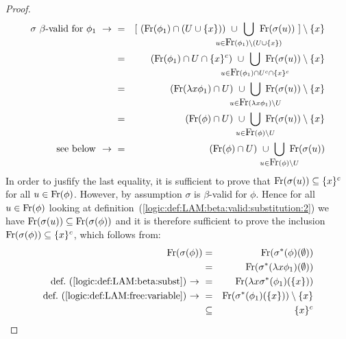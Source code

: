 \begin{proof}
\begin{eqnarray*}
        \mbox{$\sigma$ $\beta$-valid for $\phi_{1}\ \rightarrow\ $}
        &=& [\ (\free(\phi_{1})\cap(U\cup\{x\}))
        \ \cup\ 
        \!\!\!\!\!\!\!\!\!\!\!\!\!\!\!\!\!
        \bigcup_{u\in\free(\phi_{1})\setminus(U\cup\{x\})}
        \!\!\!\!\!\!\!\!\!\!\!\!\!\!\!
        \free(\sigma(u))
        \ ]\setminus\{x\}\\
        &=&(\free(\phi_{1})\cap U\cap \{x\}^{c})
        \ \cup\ 
        \!\!\!\!\!\!\!\!\!\!\!\!\!\!\!\!\!\!
        \bigcup_{u\in\free(\phi_{1})\cap U^{c}\cap\{x\}^{c}}
        \!\!\!\!\!\!\!\!\!\!\!\!\!\!\!\!
        \free(\sigma(u))\setminus\{x\}\\
        &=&(\free(\lambda x\phi_{1})\cap U)
        \ \cup\ 
        \!\!\!\!\!\!\!\!\!\!\!\!\!
        \bigcup_{u\in\free(\lambda x\phi_{1})\setminus U}
        \!\!\!\!\!\!\!\!\!\!\!
        \free(\sigma(u))\setminus\{x\}\\
        &=&(\free(\phi)\cap U)
        \ \cup\ 
        \!\!\!\!\!\!\!\!\!
        \bigcup_{u\in\free(\phi)\setminus U} 
        \!\!\!\!\!\!\!
        \free(\sigma(u))\setminus\{x\}\\
        \mbox{see below $\ \rightarrow\ $}
        &=&(\free(\phi)\cap U)
        \ \cup\ 
        \!\!\!\!\!\!\!\!\!
        \bigcup_{u\in\free(\phi)\setminus U}
        \!\!\!\!\!\!\!
        \free(\sigma(u))
    \end{eqnarray*}
    In order to jusfify the last equality, it is sufficient to prove
    that $\mbox{\rm Fr}(\sigma(u))\subseteq\{x\}^{c}$ for all $u\in\mbox{\rm Fr}(\phi)$.
    However, by assumption $\sigma$ is $\beta$-valid for $\phi$. Hence
    for all $u\in\mbox{\rm Fr}(\phi)$ looking at 
    definition~(\ref{logic:def:LAM:beta:valid:substitution:2}) we have 
    $\mbox{\rm Fr}(\sigma(u))\subseteq\mbox{\rm Fr}(\sigma(\phi))$ and it is therefore 
    sufficient to prove the inclusion $\mbox{\rm Fr}(\sigma(\phi))\subseteq\{x\}^{c}$,
    which follows from:
    \begin{eqnarray*}
        \mbox{\rm Fr}(\sigma(\phi))
        &=&\mbox{\rm Fr}(\sigma^{*}(\phi)(\emptyset))\\
        &=&\mbox{\rm Fr}(\sigma^{*}(\lambda x\phi_{1})(\emptyset))\\
        \mbox{def.~(\ref{logic:def:LAM:beta:subst})$\ \rightarrow\ $}
        &=&\mbox{\rm Fr}(\lambda x \sigma^{*}(\phi_{1})(\{x\}))\\
        \mbox{def.~(\ref{logic:def:LAM:free:variable})$\ \rightarrow\ $}
        &=&\mbox{\rm Fr}(\sigma^{*}(\phi_{1})(\{x\}))\setminus\{x\}\\
        &\subseteq&\{x\}^{c}
    \end{eqnarray*}
\end{proof}

